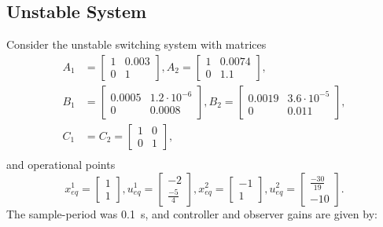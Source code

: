 \FloatBarrier

\subsection{Unstable System}%
\label{subsec:unstable-system}

Consider the unstable switching system with matrices
%
\begin{align*}
  A_1 & =
  \begin{bmatrix}
    1 & 0.003 \\
    0 & 1
  \end{bmatrix},
  A_2 = \begin{bmatrix}
    1 & 0.0074 \\
    0 & 1.1
  \end{bmatrix}, \\
  B_1 & =
  \begin{bmatrix}
    0.0005 & 1.2\cdot{}10^{-6} \\
    0      & 0.0008
  \end{bmatrix},
  B_2 = \begin{bmatrix}
    0.0019 & 3.6\cdot{}10^{-5} \\
    0      & 0.011
  \end{bmatrix}, \\
  C_1 & = C_2 =
  \begin{bmatrix}
    1 & 0 \\
    0 & 1
  \end{bmatrix},       \\
\end{align*}
%
and operational points
%
\[
  x_{eq}^1 = \begin{bmatrix}
    1 \\ 1
  \end{bmatrix},
  u_{eq}^1 = \begin{bmatrix}
    -2 \\ \frac{-5}{4}
  \end{bmatrix},
  x_{eq}^2 = \begin{bmatrix}
    -1 \\ 1
  \end{bmatrix},
  u_{eq}^2 = \begin{bmatrix}
    \frac{-30}{19} \\ -10
  \end{bmatrix}.
\]
%
The sample-period was \SI{0.1}{\second}, and controller and observer gains are
given by:
%
\scriptsize
